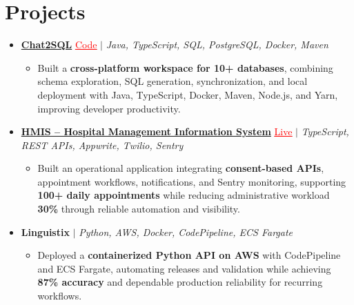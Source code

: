 \documentclass[letterpaper,10pt]{article}
\newcommand{\itemTail}{\vspace{-4pt}}
\newcommand{\projGap}{\vspace{3pt}}
\newcommand{\resumeItem}[1]{\item\small{{#1 \itemTail}}}
\newcommand{\resumeProjectHeading}[1]{\item \small #1 \vspace{-2pt}}
\newcommand{\resumeProjectLink}[2]{\href{#1}{\textcolor{red}{\underline{#2}}}}
\newcommand{\resumeSubHeadingListStart}{\begin{itemize}[leftmargin=0.0in, label={}]}
\newcommand{\resumeSubHeadingListEnd}{\end{itemize}}
\newcommand{\resumeProjItemListStart}{\begin{itemize}[leftmargin=0.15in,label=\textbullet,itemsep=3pt,topsep=0pt,parsep=0pt,partopsep=0pt]}
\newcommand{\resumeProjItemListEnd}{\end{itemize}\vspace{-4pt}}
\begin{document}
\section{Projects}
\resumeSubHeadingListStart
\vspace{-2pt}
\resumeProjectHeading{\href{https://github.com/SAHAJ-BHADJA/Chat2SQL}{\textbf{Chat2SQL}} \resumeProjectLink{https://github.com/SAHAJ-BHADJA/Chat2SQL}{Code} $|$ \emph{Java, TypeScript, SQL, PostgreSQL, Docker, Maven}}
\resumeProjItemListStart
\resumeItem{Built a \textbf{cross-platform workspace for 10+ databases}, combining schema exploration, SQL generation, synchronization, and local deployment with Java, TypeScript, Docker, Maven, Node.js, and Yarn, improving developer productivity.}
\resumeProjItemListEnd
\projGap
\resumeProjectHeading{\href{https://hims-rouge.vercel.app/}{\textbf{HMIS -- Hospital Management Information System}} \resumeProjectLink{https://hims-rouge.vercel.app/}{Live} $|$ \emph{TypeScript, REST APIs, Appwrite, Twilio, Sentry}}
\resumeProjItemListStart
\resumeItem{Built an operational application integrating \textbf{consent-based APIs}, appointment workflows, notifications, and Sentry monitoring, supporting \textbf{100+ daily appointments} while reducing administrative workload \textbf{30\%} through reliable automation and visibility.}
\resumeProjItemListEnd
\projGap
\resumeProjectHeading{\textbf{Linguistix} $|$ \emph{Python, AWS, Docker, CodePipeline, ECS Fargate}}
\resumeProjItemListStart
\resumeItem{Deployed a \textbf{containerized Python API on AWS} with CodePipeline and ECS Fargate, automating releases and validation while achieving \textbf{87\% accuracy} and dependable production reliability for recurring workflows.}
\resumeProjItemListEnd
\resumeSubHeadingListEnd
\end{document}
